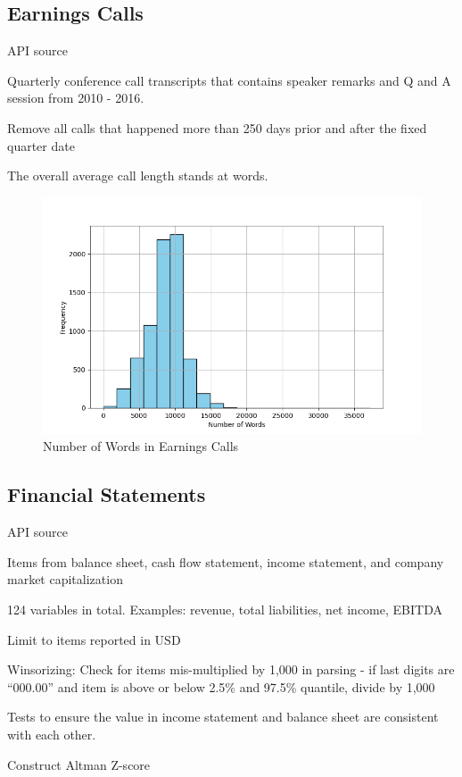 \documentclass{article}
\begin{document}
    \subsection*{Earnings Calls}

    API source

    Quarterly conference call transcripts that contains speaker remarks and Q and A session from 2010 - 2016.

    Remove all calls that happened more than 250 days prior and after the fixed quarter date

    The overall average call length stands at \avgCallLength words.

    \begin{figure}[h!]
		\centering
        \caption{Number of Words in Earnings Calls}
        \includegraphics[width=0.5\linewidth,keepaspectratio=true]{../Output/All Data EDA/NLP EDA/all_data_num_words_distribution_no_title.png}
	\end{figure}

    \subsection*{Financial Statements}

    API source

    Items from balance sheet, cash flow statement, income statement, and company market capitalization
    
    124 variables in total. Examples: revenue, total liabilities, net income, EBITDA
    
    Limit to items reported in USD
    
    Winsorizing: Check for items mis-multiplied by 1,000 in parsing - if last digits are “000.00” and item is above or below 2.5\% and 97.5\% quantile, divide by 1,000

    Tests to ensure the value in income statement and balance sheet are consistent with each other.

    Construct Altman Z-score
\end{document}
